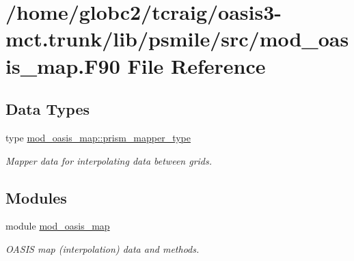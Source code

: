 \hypertarget{mod__oasis__map_8_f90}{}\section{/home/globc2/tcraig/oasis3-\/mct.trunk/lib/psmile/src/mod\+\_\+oasis\+\_\+map.F90 File Reference}
\label{mod__oasis__map_8_f90}
\subsection*{Data Types}
\begin{DoxyCompactItemize}
\item 
type \hyperlink{structmod__oasis__map_1_1prism__mapper__type}{mod\+\_\+oasis\+\_\+map\+::prism\+\_\+mapper\+\_\+type}
\begin{DoxyCompactList}\small\item\em Mapper data for interpolating data between grids. \end{DoxyCompactList}\end{DoxyCompactItemize}
\subsection*{Modules}
\begin{DoxyCompactItemize}
\item 
module \hyperlink{namespacemod__oasis__map}{mod\+\_\+oasis\+\_\+map}
\begin{DoxyCompactList}\small\item\em O\+A\+S\+IS map (interpolation) data and methods. \end{DoxyCompactList}\end{DoxyCompactItemize}
